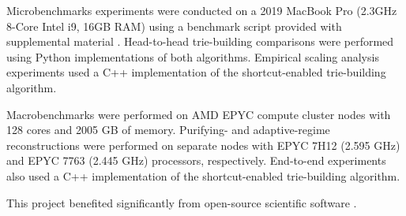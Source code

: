 Microbenchmarks experiments were conducted on a 2019 MacBook Pro (2.3GHz 8-Core Intel i9, 16GB RAM) using a benchmark script provided with supplemental material \citep{supplemental}.
Head-to-head trie-building comparisons were performed using Python implementations of both algorithms.
Empirical scaling analysis experiments used a C++ implementation of the shortcut-enabled trie-building algorithm.

Macrobenchmarks were performed on AMD EPYC compute cluster nodes with 128 cores and 2005 GB of memory.
Purifying- and adaptive-regime reconstructions were performed on separate nodes with EPYC 7H12 (2.595 GHz) and EPYC 7763 (2.445 GHz) processors, respectively.
End-to-end experiments also used a C++ implementation of the shortcut-enabled trie-building algorithm.

This project benefited significantly from open-source scientific software \citep{2020SciPy-NMeth,harris2020array,reback2020pandas,mckinney2010data,waskom2021seaborn,hunter2007matplotlib,moreno2022hstrat,yang2025downstream}.
